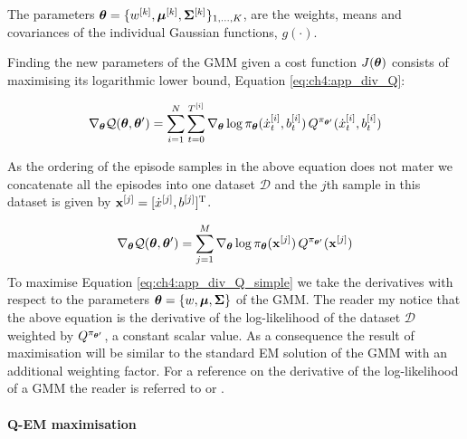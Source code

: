 \begin{appendices}
The parameters $\boldsymbol{\theta} = \{w^{[k]},\boldsymbol{\mu}^{[k]},\boldsymbol{\Sigma}^{[k]}\}_{1,\dots,K}$, are the weights, means and covariances 
of the individual Gaussian functions, $g(\cdot)$. 

Finding the new parameters of the GMM given a cost function $J(\boldsymbol{\theta})$ consists of maximising its logarithmic 
lower bound, Equation \ref{eq:ch4:app_div_Q}:

\begin{equation}\label{eq:ch4:app_div_Q}
  \nabla_{\boldsymbol{\theta}}\mathcal{Q}(\boldsymbol{\theta},\boldsymbol{\theta}') = \sum\limits_{i=1}^{N} \sum\limits_{t=0}^{T^{[i]}} \nabla_{\boldsymbol{\theta}}\log \pi_{\boldsymbol{\theta}}(\dot{x}^{[i]}_t,b^{[i]}_t) \, Q^{\pi_{\boldsymbol{\theta}'}}(\dot{x}^{[i]}_t,b^{[i]}_t)
\end{equation}

As the ordering of the episode samples in the above equation does not mater we concatenate all the episodes into one dataset $\mathcal{D}$ 
and the $j$th sample in this dataset is given by $\mathbf{x}^{[j]} = [\dot{x}^{[j]},b^{[j]}]^{\mathrm{T}}$. 

\begin{equation}\label{eq:ch4:app_div_Q_simple}
   \nabla_{\boldsymbol{\theta}}\mathcal{Q}(\boldsymbol{\theta},\boldsymbol{\theta}') = \sum\limits_{j=1}^{M} \nabla_{\boldsymbol{\theta}}\log \pi_{\boldsymbol{\theta}}(\mathbf{x}^{[j]}) \, Q^{\pi_{\boldsymbol{\theta}'}}(\mathbf{x}^{[j]})
\end{equation}
To maximise Equation \ref{eq:ch4:app_div_Q_simple} we take the derivatives with respect to the 
parameters $\boldsymbol{\theta}=\{w,\boldsymbol{\mu},\boldsymbol{\Sigma}\}$ of the GMM.  The reader my notice 
that the above equation is the derivative of the log-likelihood of the dataset $\mathcal{D}$ weighted
by $Q^{\pi_{\boldsymbol{\theta}'}}$, a constant scalar value. As a consequence the result of maximisation will 
be similar to the standard EM solution of the GMM with an additional weighting factor. For a 
reference on the derivative of the log-likelihood of a GMM the reader is referred to \cite[p. 49]{matrix_ckb}
or \cite[Chap. 9]{Bishop_2006}.


\paragraph{Q-EM maximisation}


\end{appendices}
